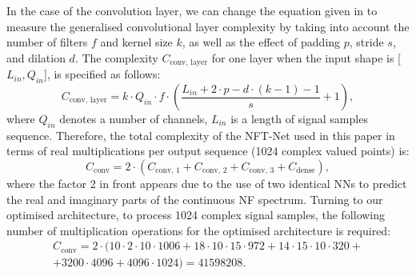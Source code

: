 In the case of the convolution layer, we can change the equation given in \cite{freire2021performance} to measure the generalised convolutional layer complexity by taking into account the number of filters $f$ and kernel size $k$, as well as the effect of padding $p$, stride $s$, and dilation $d$. The complexity $C_{\text{conv, layer}}$ for one layer when the input shape is [$L_{in},Q_{in}$], is specified as follows:
\begin{equation}
C_{\text{conv, layer}} = k \cdot Q_{in} \cdot f \cdot \left( \frac{L_{in} + 2\cdot p -d\cdot(k-1)-1}{s} +1\right) {,}
\label{eq:c_conv}
\end{equation}
where $Q_{in}$ denotes a number of channels, $L_{in}$ is a length of signal samples sequence.
Therefore, the total complexity of the NFT-Net used in this paper in terms of real multiplications per output sequence (1024 complex valued points) is:
\begin{equation}
C_{\text{conv}} = 2 \cdot (C_{\text{conv, 1}}+C_{\text{conv, 2}}+C_{\text{conv, 3}}+C_{\text{dense}}) {,}
\label{eq:c_total}
\end{equation}
where the factor 2 in front appears due to the use of two identical NNs to predict the real and imaginary parts of the continuous NF spectrum. Turning to our optimised architecture, to process  1024 complex signal samples, the following number of multiplication operations for the optimised architecture is required:
\begin{eqnarray}
    C_{\text{conv}} = 2\cdot(10\cdot2\cdot10\cdot1006+ 18\cdot10\cdot15 \cdot972 + 14\cdot15\cdot10\cdot320 + \nonumber \\ 
    + 3200\cdot4096 +4096\cdot1024) = 41598208 {.}
    \label{eq:c_total_num}
\end{eqnarray}